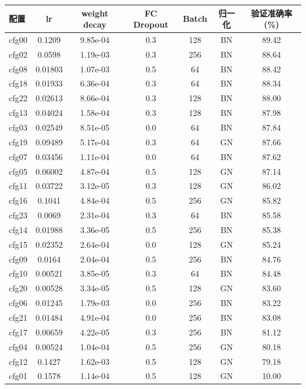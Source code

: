 \begin{tabular}{lcccccc}
\toprule
配置 & lr & weight decay & FC Dropout & Batch & 归一化 & 验证准确率 (\%) \\
\midrule
cfg00 & 0.1209 & 9.85e-04 & 0.3 & 128 & BN & 89.42 \\
cfg02 & 0.0598 & 1.19e-03 & 0.3 & 256 & BN & 88.64 \\
cfg08 & 0.01803 & 1.07e-03 & 0.5 & 64 & BN & 88.42 \\
cfg18 & 0.01933 & 6.36e-04 & 0.3 & 64 & BN & 88.34 \\
cfg22 & 0.02613 & 8.66e-04 & 0.3 & 128 & BN & 88.00 \\
cfg13 & 0.04024 & 1.58e-04 & 0.3 & 128 & BN & 87.98 \\
cfg03 & 0.02549 & 8.51e-05 & 0.0 & 64 & BN & 87.84 \\
cfg19 & 0.09489 & 5.17e-04 & 0.3 & 64 & GN & 87.66 \\
cfg07 & 0.03456 & 1.11e-04 & 0.0 & 64 & BN & 87.62 \\
cfg05 & 0.06002 & 4.87e-04 & 0.5 & 128 & GN & 87.14 \\
cfg11 & 0.03722 & 3.12e-05 & 0.3 & 128 & GN & 86.02 \\
cfg16 & 0.1041 & 4.84e-04 & 0.5 & 256 & GN & 85.82 \\
cfg23 & 0.0069 & 2.31e-04 & 0.3 & 64 & BN & 85.58 \\
cfg14 & 0.01988 & 3.36e-05 & 0.5 & 256 & BN & 85.38 \\
cfg15 & 0.02352 & 2.64e-04 & 0.0 & 128 & GN & 85.24 \\
cfg09 & 0.0164 & 2.04e-04 & 0.5 & 256 & BN & 84.76 \\
cfg10 & 0.00521 & 3.85e-05 & 0.3 & 64 & BN & 84.48 \\
cfg20 & 0.00528 & 3.34e-05 & 0.5 & 128 & GN & 83.60 \\
cfg06 & 0.01245 & 1.79e-03 & 0.0 & 256 & BN & 83.22 \\
cfg21 & 0.01484 & 4.91e-04 & 0.0 & 256 & BN & 83.08 \\
cfg17 & 0.00659 & 4.22e-05 & 0.3 & 256 & BN & 81.12 \\
cfg04 & 0.00524 & 1.04e-04 & 0.5 & 256 & GN & 80.18 \\
cfg12 & 0.1427 & 1.62e-03 & 0.5 & 128 & GN & 79.18 \\
cfg01 & 0.1578 & 1.14e-04 & 0.5 & 128 & GN & 10.00 \\
\bottomrule
\end{tabular}
